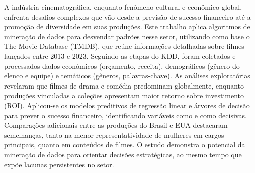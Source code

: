 A indústria cinematográfica, enquanto fenômeno cultural e econômico global, enfrenta desafios complexos que vão desde a previsão de sucesso financeiro até a promoção de diversidade em suas produções. Este trabalho aplica algoritmos de mineração de dados para desvendar padrões nesse setor, utilizando como base o The Movie Database (TMDB), que reúne informações detalhadas sobre filmes lançados entre 2013 e 2023. Seguindo as etapas do \acrfull{KDD}, foram coletados e processados dados econômicos (orçamento, receita), demográficos (gênero do elenco e equipe) e temáticos (gêneros, palavras-chave). As análises exploratórias revelaram que filmes de drama e comédia predominam globalmente, enquanto produções vinculadas a coleções apresentam maior retorno sobre investimento (\acrshort{ROI}). Aplicou-se os modelos preditivos de regressão linear e árvores de decisão para prever o sucesso financeiro, identificando variáveis como  e  como decisivas. Comparações adicionais entre as produções do Brasil e EUA destacaram semelhanças, tanto na menor representatividade de mulheres em cargos principais, quanto em conteúdos de filmes. O estudo demonstra o potencial da mineração de dados para orientar decisões estratégicas, ao mesmo tempo que expõe lacunas persistentes no setor.